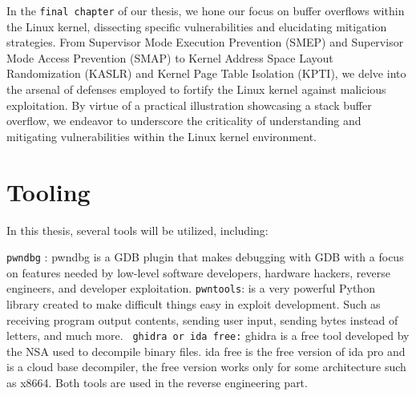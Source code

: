     In the \texttt{final chapter} of our thesis, we hone our focus on buffer overflows within the Linux kernel, dissecting specific vulnerabilities and elucidating mitigation strategies.\newline
    From Supervisor Mode Execution Prevention (SMEP) and Supervisor Mode Access Prevention (SMAP) to Kernel Address Space Layout Randomization (KASLR) and Kernel Page Table Isolation (KPTI), we delve into the arsenal of defenses employed to fortify the Linux kernel against malicious exploitation.\newline
    By virtue of a practical illustration showcasing a stack buffer overflow, we endeavor to underscore the criticality of understanding and mitigating vulnerabilities within the Linux kernel environment.


    
    \section{Tooling}
    In this thesis, several tools will be utilized, including:\newline
    
  
    \texttt{pwndbg} : pwndbg is a GDB plugin that makes debugging with GDB with a focus on features needed by low-level software developers, hardware hackers, reverse engineers, and developer exploitation.\newline
        \texttt{pwntools}: is a very powerful Python library created to make difficult things easy in exploit development.\newline
        Such as receiving program output contents, sending user input, sending bytes instead of letters, and much more.\newline
        \texttt{ ghidra or ida free:} 
        ghidra is a free tool developed by the NSA used to decompile binary files.
        ida free is the free version of ida pro and is a cloud base decompiler, the free version works only for some architecture such as x8664.\newline
        Both tools are used in the reverse engineering part.\newline
